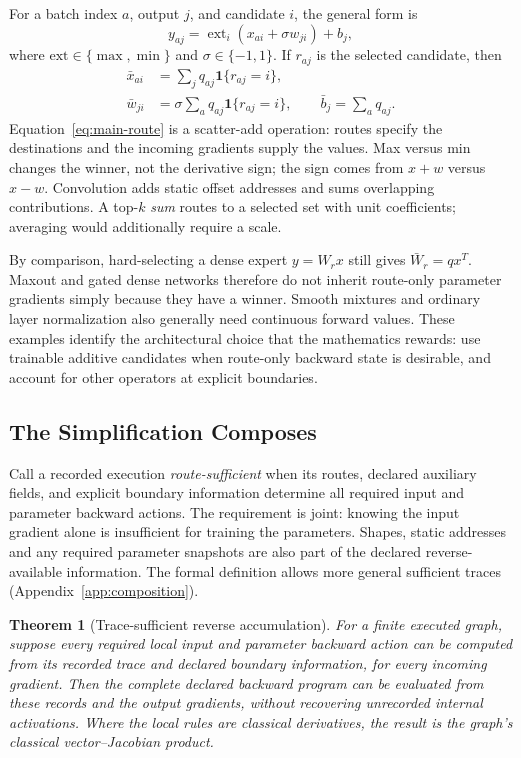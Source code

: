 \documentclass{article}
\theoremstyle{plain}
\newtheorem{theorem}{Theorem}[section]
\theoremstyle{definition}
\theoremstyle{remark}
\begin{document}
For a batch index $a$, output $j$, and candidate $i$, the general form is
\begin{equation}
 y_{aj}=\mathop{\mathrm{ext}}_i(x_{ai}+\sigma w_{ji})+b_j,
\end{equation}
where $\mathrm{ext}\in\{\max,\min\}$ and $\sigma\in\{-1,1\}$.
If $r_{aj}$ is the selected candidate, then
\begin{align}
 \bar x_{ai}&=\sum_j q_{aj}\mathbf{1}\{r_{aj}=i\},\nonumber\\
 \bar w_{ji}&=\sigma\sum_a q_{aj}\mathbf{1}\{r_{aj}=i\},\qquad
 \bar b_j=\sum_a q_{aj}.
 \label{eq:main-route}
\end{align}
Equation~\ref{eq:main-route} is a scatter-add operation: routes specify the
destinations and the incoming gradients supply the values. Max versus min
changes the winner, not the derivative sign; the sign comes from $x+w$
versus $x-w$. Convolution adds static offset addresses and sums overlapping
contributions. A top-$k$ \emph{sum} routes to a selected set with unit
coefficients; averaging would additionally require a scale.

By comparison, hard-selecting a dense expert $y=W_rx$ still gives
$\bar W_r=qx^T$. Maxout and gated dense networks therefore do not inherit
route-only parameter gradients simply because they have a winner.
Smooth mixtures and ordinary layer normalization also generally need
continuous forward values. These examples identify the architectural
choice that the mathematics rewards: use trainable additive candidates
when route-only backward state is desirable, and account for other
operators at explicit boundaries.

\subsection{The Simplification Composes}

Call a recorded execution \emph{route-sufficient} when its routes, declared
auxiliary fields, and explicit boundary information determine all required
input and parameter backward actions. The requirement is joint: knowing
the input gradient alone is insufficient for training the parameters.
Shapes, static addresses and any required parameter snapshots are also
part of the declared reverse-available information. The formal definition
allows more general sufficient traces (Appendix~\ref{app:composition}).

\begin{theorem}[Trace-sufficient reverse accumulation]
\label{thm:main}
For a finite executed graph, suppose every required local input and
parameter backward action can be computed from its recorded trace and
declared boundary information, for every incoming gradient. Then the
complete declared backward program can be evaluated from these records
and the output gradients, without recovering unrecorded internal
activations. Where the local rules are classical derivatives, the result
is the graph's classical vector--Jacobian product.
\end{theorem}
\end{document}
